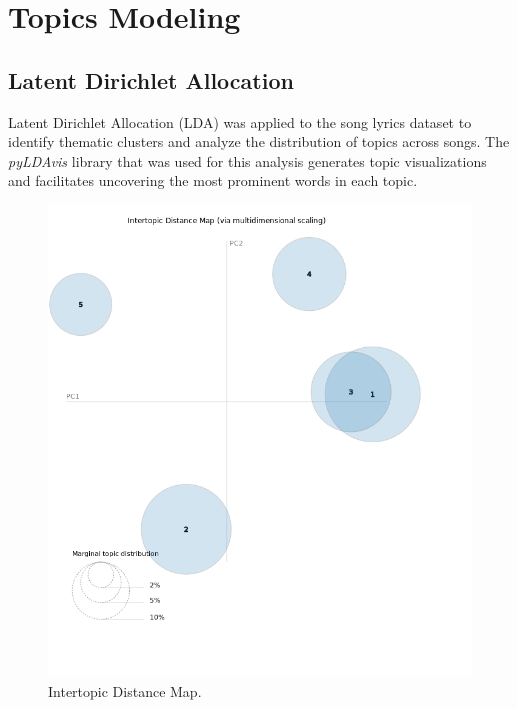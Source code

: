 

\section{Topics Modeling}
\label{sec:topicsmodeling}

\subsection{Latent Dirichlet Allocation}

Latent Dirichlet Allocation (LDA) was applied to the song lyrics dataset to
identify thematic clusters and analyze the distribution of topics across songs.
The \textit{pyLDAvis} library that was used for this analysis generates topic
visualizations and facilitates uncovering the most prominent words in each
topic.\cite{pylda}

\begin{center}
\begin{figure}[H]
  \centering
  \includegraphics[width=6in]{img/topics/png/topics.png}
  \caption{Intertopic Distance Map.}
  \label{Figure:intertopicdistancemap}
\end{figure}
\end{center}

